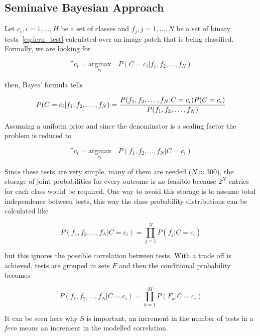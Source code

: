 \subsection{Seminaive Bayesian Approach}
\label{sub:seminaive_bayesian_approach}

Let $c_i, i = 1,\ldots,H$ be a set of classes and $f_j, j=1,\ldots,N$ be a set of binary tests~\ref{eq:fern_test} calculated over an image patch that is being classified. Formally, we are looking for

\begin{equation}
  \^c_i = \underset{c_i}{\text{argmax}} \quad P(C = c_i | f_1, f_2, \ldots, f_N)
\end{equation}

then, Bayes' formula tells

\begin{equation}
  P(C = c_i | f_1, f_2, \ldots, f_N) = \frac{P(f_1,f_2,\ldots,f_N \arrowvert C=c_i) P(C=c_i)}{P(f_1,f_2,\ldots,f_N)}
\end{equation}

Assuming a uniform prior and since the denominator is a scaling factor the problem is reduced to

\begin{equation}
  \^c_i = \underset{c_i}{\text{argmax}} \quad P(f_1, f_2, \ldots, f_N | C = c_i)
\end{equation}

Since these tests are very simple, many of them are needed ($N \approx 300$), the storage of joint probabilities for every outcome is no feasible because $2^N$ entries for each class would be required. One way to avoid this storage is to assume total independence between tests, this way the class probability distributions can be calculated like

\begin{equation}
  P(f_1, f_2, \ldots, f_N | C = c_i) = \prod^{N}_{j=1}P(f_j | C = c_i)
\end{equation}

but this ignores the possible correlation between tests. With  a trade off is achieved, tests are grouped in sets $F$ and then the conditional probability becomes

\begin{equation}
  P(f_1, f_2, \ldots, f_N | C = c_i) = \prod^{M}_{k=1} P(F_k | C = c_i)
\end{equation}

It can be seen here why $S$ is important, an increment in the number of tests in a \textit{fern} means an increment in the modelled correlation.\\

